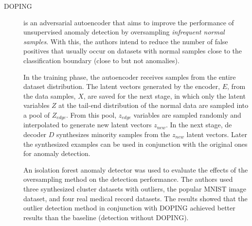     
    

\begin{description}
    \item[DOPING \cite{lim.etal_DOPINGGenerativeData_2018}] is an adversarial autoencoder that aims to improve the performance of unsupervised anomaly detection by oversampling \textit{infrequent normal samples}. With this, the authors intend to reduce the number of false positives that usually occur on datasets with normal samples close to the classification boundary (close to but not anomalies). 

    In the training phase, the autoencoder receives samples from the entire dataset distribution. The latent vectors generated by the encoder, $E$, from the data samples, $X$, are saved for the next stage, in which only the latent variables $Z$ at the tail-end distribution of the normal data are sampled into a pool of $Z_{edge}$. From this pool, $z_{edge}$ variables are sampled randomly and interpolated to generate new latent vectors $z_{new}$. In the next stage, de decoder $D$ synthesizes minority samples from the $z_{new}$ latent vectors. Later the synthesized examples can be used in conjunction with the original ones for anomaly detection.

    An isolation forest anomaly detector was used to evaluate the effects of the oversampling method on the detection performance. The authors used three synthesized cluster datasets with outliers, the popular MNIST image dataset, and four real medical record datasets. The results showed that the outlier detection method in conjunction with DOPING achieved better results than the baseline (detection without DOPING). 
\end{description}

